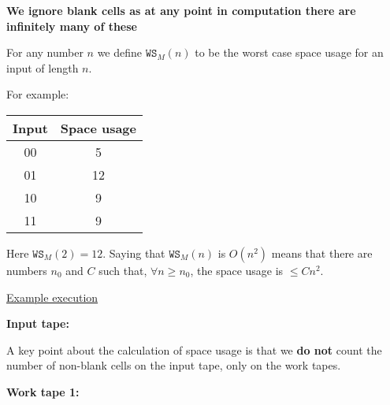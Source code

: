 \documentclass{article}
\begin{document}
\textbf{We ignore blank cells as at any point in computation there are infinitely many of these}

For any number $n$ we define $\texttt{WS}_{M}(n)$ to be the worst case space usage for an input of length $n$.

For example:

\begin{center}
 \begin{tabular}{|c|c|}
 \hline
 Input & Space usage \\ [0.5ex]
 \hline\hline
 00 & 5 \\
 \hline
 01 & 12 \\
 \hline
 10 & 9 \\
 \hline
 11 & 9\\
 \hline
\end{tabular}
\end{center}

Here $\texttt{WS}_{M}(2) = 12 $. Saying that $\texttt{WS}_{M}(n) $ is $O(n^{2})$ means that there are numbers $n_{0}$ and $C$ such that, $\forall n \geq n_{0}$, the space usage is $\leq Cn^{2}$.

\underline{Example execution}

\textbf{Input tape:}
\begin{center}


\end{center}

A key point about the calculation of space usage is that we \textbf{do not} count the number of non-blank cells on the input tape, only on the work tapes.

\textbf{Work tape 1:}
\begin{center}


\end{center}
\end{document}
